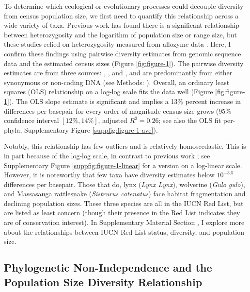 \documentclass[11pt]{article}
\newcommand{\Newnameref}[1]{\textit{\nameref{#1}}}
\begin{document}
To determine which ecological or evolutionary processes could decouple
diversity from census population size, we first need to quantify this
relationship across a wide variety of taxa. Previous work has found there is a
significant relationship between heterozygosity and the logarithm of population
size or range size, but these studies relied on heterozygosity measured from
allozyme data
\parencite{Soule1976-he,Frankham1996-yb,Nei1984-zi,Leffler2012-zj}. Here, I
confirm these findings using pairwise diversity estimates from genomic sequence
data and the estimated census sizes (Figure \ref{fig:figure-1}). The pairwise
diversity estimates are from three sources: \textcite{Leffler2012-zj},
\textcite{Corbett-Detig2015-gt}, and \textcite{Romiguier2014-bp}, and are
predominantly from either synonymous or non-coding DNA (see Methods:
\Newnameref{sec:methods-diversity}). Overall, an ordinary least squares (OLS)
relationship on a log-log scale fits the data well (Figure \ref{fig:figure-1}).
The OLS slope estimate is significant and implies a 13\% percent increase in
differences per basepair for every order of magnitude census size grows (95\%
confidence interval $[12\%, 14\%]$, adjusted $R^2 = 0.26$; see also the OLS fit
per-phyla, Supplementary Figure \ref{suppfig:figure-1-ave}). 

Notably, this relationship has few outliers and is relatively homoscedastic.
This is in part because of the log-log scale, in contrast to previous work
\parencite{Nei1984-zi,Soule1976-he}; see Supplementary Figure
\ref{suppfig:figure-1-linear} for a version on a log-linear scale. However, it
is noteworthy that few taxa have diversity estimates below $10^{-3.5}$
differences per basepair. Those that do, lynx (\emph{Lynx Lynx}), wolverine
(\emph{Gulo gulo}), and Massasauga rattlesnake (\emph{Sistrurus catenatus})
face habitat fragmentation and declining population sizes. These three species
are all in the IUCN Red List, but are listed as least concern (though their
presence in the Red List indicates they are of conservation interest). In
Supplementary Material Section \Newnameref{supinfo:div-iucn}, I explore more
about the relationships between IUCN Red List status, diversity, and population
size.

\subsection*{Phylogenetic Non-Independence and the Population Size Diversity Relationship}
\end{document}
